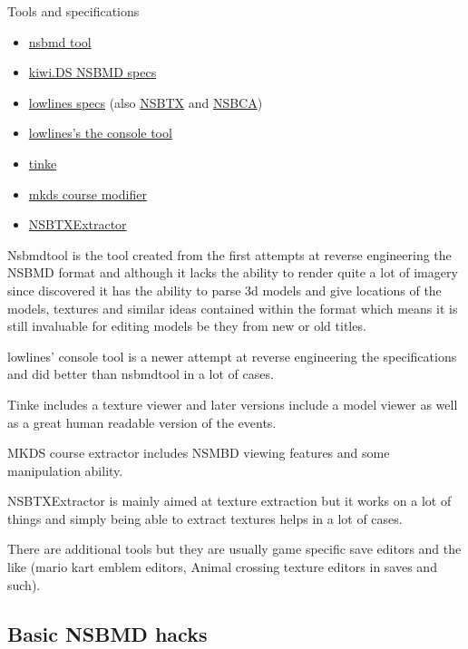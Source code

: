 \documentclass[
]{book}
\providecommand{\tightlist}{%
  \setlength{\itemsep}{0pt}\setlength{\parskip}{0pt}}
\begin{document}
Tools and specifications

\begin{itemize}
\tightlist
\item
  \href{http://filetrip.net/nds-downloads/utilities/download-nsbmd-tool-10-f28230.html}{nsbmd tool}
\item
  \href{http://kiwi.ds.googlepages.com/nsbmd.html}{kiwi.DS NSBMD specs}
\item
  \href{http://llref.emutalk.net/docs/?file=xml/bmd0.xml\#xml-doc}{lowlines specs} (also \href{http://llref.emutalk.net/docs/?file=xml/btx0.xml\#xml-doc}{NSBTX} and \href{http://llref.emutalk.net/docs/?file=xml/bca0.xml\#xml-doc}{NSBCA})
\item
  \href{http://llref.emutalk.net/projects/ctool/}{lowlines's the console tool}
\item
  \href{https://github.com/pleonex/tinke}{tinke}
\item
  \href{http://gbatemp.net/topic/299444-mkds-course-modifier/}{mkds course modifier}
\item
  \href{http://filetrip.net/nds-downloads/utilities/download-nsbtxextractor-10-f29535.html}{NSBTXExtractor}
\end{itemize}

Nsbmdtool is the tool created from the first attempts at reverse engineering the NSBMD format and although it lacks the ability to render quite a lot of imagery since discovered it has the ability to parse 3d models and give locations of the models, textures and similar ideas contained within the format which means it is still invaluable for editing models be they from new or old titles.

lowlines' console tool is a newer attempt at reverse engineering the specifications and did better than nsbmdtool in a lot of cases.

Tinke includes a texture viewer and later versions include a model viewer as well as a great human readable version of the events.

MKDS course extractor includes NSMBD viewing features and some manipulation ability.

NSBTXExtractor is mainly aimed at texture extraction but it works on a lot of things and simply being able to extract textures helps in a lot of cases.

There are additional tools but they are usually game specific save editors and the like (mario kart emblem editors, Animal crossing texture editors in saves and such).

\hypertarget{basic-nsbmd-hacks}{%
\subsection{Basic NSBMD hacks}\label{basic-nsbmd-hacks}}
\end{document}
